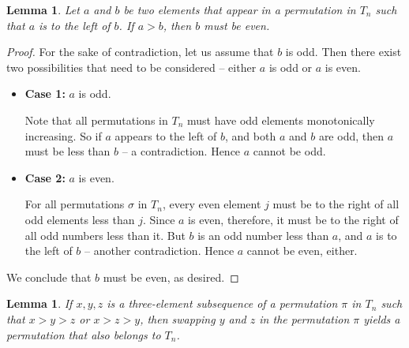 \documentclass[11pt,letterpaper,twoside,english]{article}
\theoremstyle{theorem}
\newtheorem{lemma}[theorem]{Lemma}
\theoremstyle{remark}
\begin{document}
\begin{lemma}
\label{tn_avoidance}
Let $a$ and $b$ be two elements that appear in a permutation in $T_n$ such that $a$ is to the left of $b$. If $a > b$, then $b$ must be even.
\end{lemma}

\begin{proof}
For the sake of contradiction, let us assume that $b$ is odd. Then there exist two possibilities that need to be considered -- either $a$ is odd or $a$ is even.

\begin{itemize}
\item \textbf{Case 1:} $a$ is odd.

Note that all permutations in $T_n$ must have odd elements monotonically increasing. So if $a$ appears to the left of $b$, and both $a$ and $b$ are odd, then $a$ must be less than $b$ -- a contradiction. Hence $a$ cannot be odd.

\item \textbf{Case 2:} $a$ is even.

For all permutations $\sigma$ in $T_n$, every even element $j$ must be to the right of all odd elements less than $j$. Since $a$ is even, therefore, it must be to the right of all odd numbers less than it. But $b$ is an odd number less than $a$, and $a$ is to the left of $b$ -- another contradiction. Hence $a$ cannot be even, either.
\end{itemize}

We conclude that $b$ must be even, as desired.
\end{proof}

\begin{lemma}
\label{swapping_lemma}
If $x, y, z$ is a three-element subsequence of a permutation $\pi$ in $T_n$ such that $x > y > z$ or $x > z > y$, then swapping $y$ and $z$ in the permutation $\pi$ yields a permutation that also belongs to $T_n$.
\end{lemma}
\end{document}
